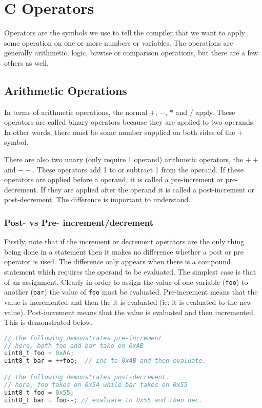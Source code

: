 \chapter{C Operators}
Operators are the symbols we use to tell the compiler that we want to apply some operation on one or more numbers or variables.
The operations are generally arithmetic, logic, bitwise or comparison operations, but there are a few others as well.\\

\section{Arithmetic Operations}
In terms of arithmetic operations, the normal $+$, $-$, $*$ and $/$ apply. These operators are called binary operators because they are applied to two operands. In other words, there must be some number supplied on both sides of the $+$ symbol.

There are also two unary (only require 1 operand) arithmetic operators, the $++$ and $--$. These operators add 1 to or subtract 1 from the operand. If these operators are applied before a operand, it is called a pre-increment or pre-decrement. If they are applied after the operand it is called a post-increment or post-decrement. The difference is important to understand. 

\subsection{Post- vs Pre- increment/decrement}
Firstly, note that if the increment or decrement operators are the only thing being done in a statement then it makes no difference whether a post or pre operator is used. 
The difference only appears when there is a compound statement which requires the operand to be evaluated. The simplest case is that of an assignment. Clearly in order to assign the value of one variable (\texttt{foo}) to another (\texttt{bar}) the value of \texttt{foo} must be evaluated. 
Pre-increment means that the value is incremented and then the it is evaluated (ie: it is evaluated to the new value). 
Post-increment means that the value is evaluated and then incremented. 
This is demonstrated below.


\begin{lstlisting}[language=C]
// the following demonstrates pre-increment
// here, both foo and bar take on 0xAB
uint8_t foo = 0xAA;
uint8_t bar = ++foo;  // inc to 0xAB and then evaluate.

// the following demonstrates post-decrement.
// here, foo takes on 0x54 while bar takes on 0x55
uint8_t foo = 0x55;
uint8_t bar = foo--; // evaluate to 0x55 and then dec. 
\end{lstlisting}

